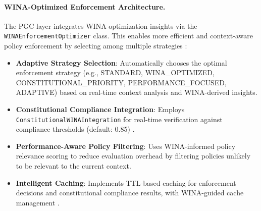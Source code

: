 \documentclass[manuscript,screen,review,anonymous,9pt]{acmart}
\begin{document}
\paragraph{WINA-Optimized Enforcement Architecture.} The PGC layer integrates WINA optimization insights \cite{WINA2024NeuronActivation} via the \texttt{WINAEnforcementOptimizer} class. This enables more efficient and context-aware policy enforcement by selecting among multiple strategies \cite{PolicyEnforcementOptimization2024}:
\begin{itemize}[leftmargin=*,itemsep=1pt,parsep=1pt]
    \item \textbf{Adaptive Strategy Selection}: Automatically chooses the optimal enforcement strategy (e.g., STANDARD, WINA\_OPTIMIZED, CONSTITUTIONAL\_PRIORITY, PERFORMANCE\_FOCUSED, ADAPTIVE) based on real-time context analysis and WINA-derived insights.
    \item \textbf{Constitutional Compliance Integration}: Employs \texttt{ConstitutionalWINAIntegration} for real-time verification against compliance thresholds (default: 0.85) \cite{ConstitutionalCompliance2024}.
    \item \textbf{Performance-Aware Policy Filtering}: Uses WINA-informed policy relevance scoring to reduce evaluation overhead by filtering policies unlikely to be relevant to the current context.
    \item \textbf{Intelligent Caching}: Implements TTL-based caching for enforcement decisions and constitutional compliance results, with WINA-guided cache management \cite{IntelligentCaching2024}.
\end{itemize}
\end{document}
